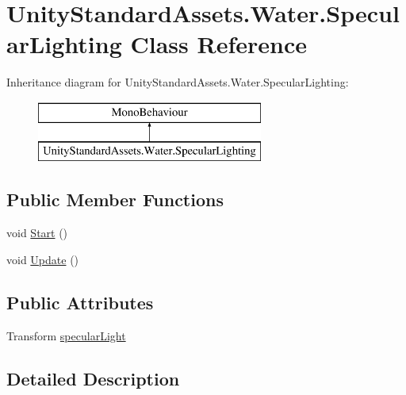 \hypertarget{class_unity_standard_assets_1_1_water_1_1_specular_lighting}{}\section{Unity\+Standard\+Assets.\+Water.\+Specular\+Lighting Class Reference}
\label{class_unity_standard_assets_1_1_water_1_1_specular_lighting}
Inheritance diagram for Unity\+Standard\+Assets.\+Water.\+Specular\+Lighting\+:\begin{figure}[H]
\begin{center}
\leavevmode
\includegraphics[height=2.000000cm]{class_unity_standard_assets_1_1_water_1_1_specular_lighting}
\end{center}
\end{figure}
\subsection*{Public Member Functions}
\begin{DoxyCompactItemize}
\item 
void \mbox{\hyperlink{class_unity_standard_assets_1_1_water_1_1_specular_lighting_a07ab47d7f4b7e70150aed7dd5b4d5757}{Start}} ()
\item 
void \mbox{\hyperlink{class_unity_standard_assets_1_1_water_1_1_specular_lighting_a1c0024700a30bd767d5cd78552c96e0b}{Update}} ()
\end{DoxyCompactItemize}
\subsection*{Public Attributes}
\begin{DoxyCompactItemize}
\item 
Transform \mbox{\hyperlink{class_unity_standard_assets_1_1_water_1_1_specular_lighting_a715795cec47659a254638d071c0c9c51}{specular\+Light}}
\end{DoxyCompactItemize}


\subsection{Detailed Description}


